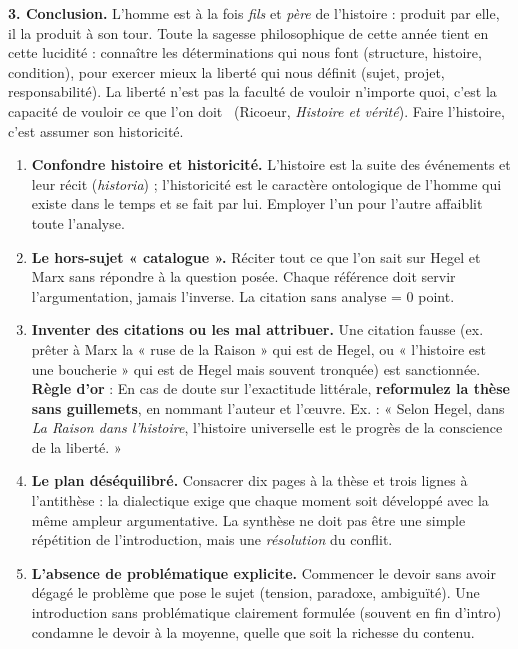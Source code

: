 \documentclass[11pt]{article}
\begin{document}
\begin{exoresolu}
\textbf{3. Conclusion.} L'homme est à la fois \emph{fils} et \emph{père} de l'histoire : produit par elle, il la produit à son tour. Toute la sagesse philosophique de cette année tient en cette lucidité : connaître les déterminations qui nous font (structure, histoire, condition), pour exercer mieux la liberté qui nous définit (sujet, projet, responsabilité). \guillemotleft La liberté n'est pas la faculté de vouloir n'importe quoi, c'est la capacité de vouloir ce que l'on doit \guillemotright\ (Ricoeur, \emph{Histoire et vérité}). Faire l'histoire, c'est assumer son historicité.
\end{exoresolu}

\begin{attention}
\begin{enumerate}
\item \textbf{Confondre histoire et historicité.} L'histoire est la suite des événements et leur récit (\emph{historia}) ; l'historicité est le caractère ontologique de l'homme qui existe dans le temps et se fait par lui. Employer l'un pour l'autre affaiblit toute l'analyse.
\item \textbf{Le hors-sujet « catalogue ».} Réciter tout ce que l'on sait sur Hegel et Marx sans répondre à la question posée. Chaque référence doit servir l'argumentation, jamais l'inverse. La citation sans analyse = 0 point.
\item \textbf{Inventer des citations ou les mal attribuer.} Une citation fausse (ex. prêter à Marx la « ruse de la Raison » qui est de Hegel, ou « l'histoire est une boucherie » qui est de Hegel mais souvent tronquée) est sanctionnée. \textbf{Règle d'or} : En cas de doute sur l'exactitude littérale, \textbf{reformulez la thèse sans guillemets}, en nommant l'auteur et l'œuvre. Ex. : « Selon Hegel, dans \emph{La Raison dans l'histoire}, l'histoire universelle est le progrès de la conscience de la liberté. »
\item \textbf{Le plan déséquilibré.} Consacrer dix pages à la thèse et trois lignes à l'antithèse : la dialectique exige que chaque moment soit développé avec la même ampleur argumentative. La synthèse ne doit pas être une simple répétition de l'introduction, mais une \emph{résolution} du conflit.
\item \textbf{L'absence de problématique explicite.} Commencer le devoir sans avoir dégagé le problème que pose le sujet (tension, paradoxe, ambiguïté). Une introduction sans problématique clairement formulée (souvent en fin d'intro) condamne le devoir à la moyenne, quelle que soit la richesse du contenu.
\end{enumerate}
\end{attention}
\end{document}
